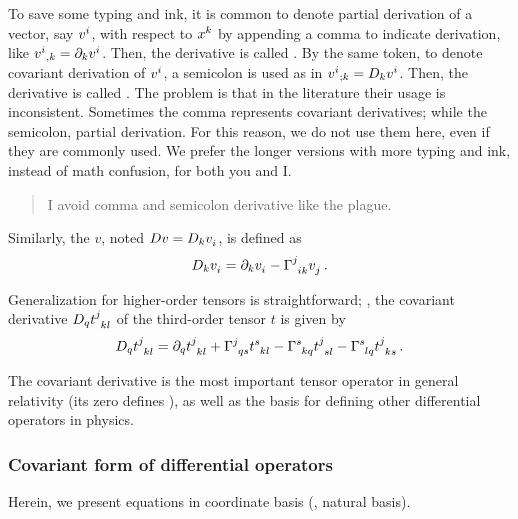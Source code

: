 \begin{remark}
  To save some typing and ink, it is common to denote partial derivation of a vector, say $\tvec vi$, with respect to $\tvec\pos k$ by appending a comma to indicate derivation, like $\tvec vi_{,k} = \ipd k\tvec vi$. Then, the derivative is called . By the same token, to denote covariant derivation of $\tvec vi$, a semicolon is used as in $\tvec vi_{;k} = D_k\tvec vi$. Then, the derivative is called . The problem is that in the literature their usage is inconsistent. Sometimes the comma represents covariant derivatives; while the semicolon, partial derivation. For this reason, we do not use them here, even if they are commonly used. We prefer the longer versions with more typing and ink, instead of math confusion, for both you and I.
  \begin{quotation}
    I avoid comma and semicolon derivative like the plague.
  \end{quotation}
\end{remark}

Similarly, the  $v$, noted $Dv = D_k\tcov vi$, is defined as
%
\begin{equation*}
  D_k\tcov vi = \ipd k\tcov vi - \skchris jik \tcov vj\,.
\end{equation*}

Generalization for higher-order tensors is straightforward; \eg, the covariant derivative $D_q\tensor{t}{^j_k_l}$ of the third-order tensor $t$ is given by
%
\begin{equation*}
  D_q\tensor{t}{^j_k_l} = \ipd q\tensor{t}{^j_k_l} 
                        + \skchris jqs\tensor{t}{^s_k_l} 
                        - \skchris skq\tensor{t}{^j_s_l} 
                        - \skchris slq\tensor{t}{^j_k_s}\,.
\end{equation*}

\begin{remark}
  The covariant derivative is the most important tensor operator in general relativity (its zero defines ), as well as the basis for defining other differential operators in physics.
\end{remark}


\subsubsection{Covariant form of differential operators}
%
Herein, we present equations in coordinate basis (\aka, natural basis).

